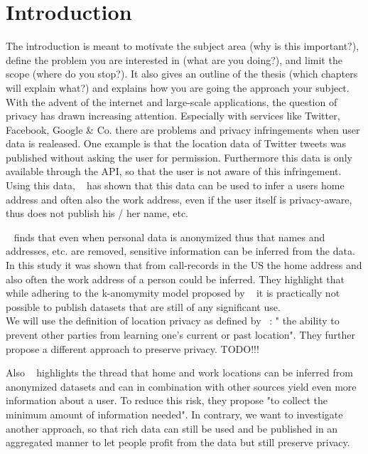 
\chapter{Introduction}\label{chapter:introduction}

The introduction is meant to motivate the subject area (why is this important?),
define the problem you are interested in (what are you doing?), and limit the
scope (where do you stop?). It also gives an outline of the thesis (which chapters
will explain what?) and explains how you are going the approach your subject.
\\

With the advent of the internet and large-scale applications, the question of privacy has drawn increasing attention.
Especially with services like Twitter, Facebook, Google \& Co. there are problems and privacy infringements when user data is realeased.
One example is that the location data of Twitter tweets was published without asking the user for permission. Furthermore this data is only available through the API,
so that the user is not aware of this infringement. Using this data, ~\parencite{twitter} has shown that this data can be used to infer a users home address and often also the work address, even if the user itself is privacy-aware, thus does not publish his / her name, etc.


~\parencite{cellphone} finds that even when personal data is anonymized thus that names and addresses, etc. are removed, sensitive information can be inferred from the data.
In this study it was shown that from call-records in the US the home address and also often the work address of a person could be inferred.
They highlight that while adhering to the k-anomymity model proposed by ~\parencite{k-anonymity} it is practically not possible to publish datasets that are still of any significant use.
\\

We will use the definition of location privacy as defined by ~\parencite{location-privacy}: " the ability to prevent other parties from learning
one’s current or past location". They further propose a different approach to preserve privacy. TODO!!!

Also ~\parencite{privacy-home-work-pairs} highlights the thread that home and work locations can be inferred from anonymized datasets and can in combination with other sources yield even more information about a user. To reduce this risk, they propose "to collect the minimum amount of information needed". In contrary, we want to investigate another approach, so that rich data can still be used and be published in an aggregated manner to let people profit from the data but still preserve privacy.

